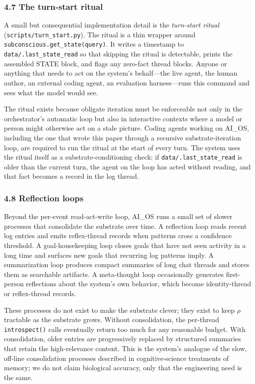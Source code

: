 \documentclass[11pt,letterpaper]{article}
\begin{document}
\subsubsection*{4.7 The turn-start ritual}

A small but consequential implementation detail is the \emph{turn-start ritual} (\texttt{scripts/turn\_start.py}). The ritual is a thin wrapper around \texttt{subconscious.get\_state(query)}. It writes a timestamp to \texttt{data/.last\_state\_read} so that skipping the ritual is detectable, prints the assembled STATE block, and flags any zero-fact thread blocks. Anyone or anything that needs to act on the system's behalf---the live agent, the human author, an external coding agent, an evaluation harness---runs this command and sees what the model would see.

The ritual exists because obligate iteration must be enforceable not only in the orchestrator's automatic loop but also in interactive contexts where a model or person might otherwise act on a stale picture. Coding agents working on AI\_OS, including the one that wrote this paper through a recursive substrate-iteration loop, are required to run the ritual at the start of every turn. The system uses the ritual itself as a substrate-conditioning check: if \texttt{data/.last\_state\_read} is older than the current turn, the agent on the loop has acted without reading, and that fact becomes a record in the log thread.

\subsubsection*{4.8 Reflection loops}

Beyond the per-event read-act-write loop, AI\_OS runs a small set of slower processes that consolidate the substrate over time. A reflection loop reads recent log entries and emits reflex-thread records when patterns cross a confidence threshold. A goal-housekeeping loop closes goals that have not seen activity in a long time and surfaces new goals that recurring log patterns imply. A summarization loop produces compact summaries of long chat threads and stores them as searchable artifacts. A meta-thought loop occasionally generates first-person reflections about the system's own behavior, which become identity-thread or reflex-thread records.

These processes do not exist to make the substrate clever; they exist to keep $\rho$ tractable as the substrate grows. Without consolidation, the per-thread \texttt{introspect()} calls eventually return too much for any reasonable budget. With consolidation, older entries are progressively replaced by structured summaries that retain the high-relevance content. This is the system's analogue of the slow, off-line consolidation processes described in cognitive-science treatments of memory; we do not claim biological accuracy, only that the engineering need is the same.
\end{document}
